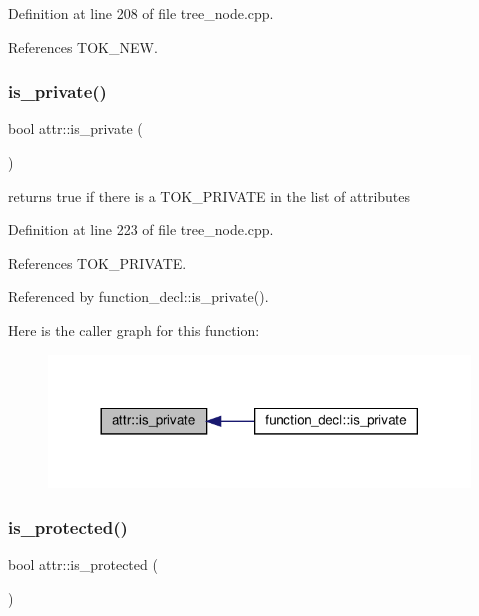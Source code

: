 Definition at line 208 of file tree\+\_\+node.\+cpp.



References T\+O\+K\+\_\+\+N\+EW.

\mbox{\label{structattr_ad63a36123b0f975d24acdab8651c2b70}} 
\subsubsection{\texorpdfstring{is\+\_\+private()}{is\_private()}}
{\footnotesize\ttfamily bool attr\+::is\+\_\+private (\begin{DoxyParamCaption}{ }\end{DoxyParamCaption})}



returns true if there is a T\+O\+K\+\_\+\+P\+R\+I\+V\+A\+TE in the list of attributes 



Definition at line 223 of file tree\+\_\+node.\+cpp.



References T\+O\+K\+\_\+\+P\+R\+I\+V\+A\+TE.



Referenced by function\+\_\+decl\+::is\+\_\+private().

Here is the caller graph for this function\+:
\nopagebreak
\begin{figure}[H]
\begin{center}
\leavevmode
\includegraphics[width=317pt]{dc/de4/structattr_ad63a36123b0f975d24acdab8651c2b70_icgraph}
\end{center}
\end{figure}
\mbox{\label{structattr_a9082e7e1db15a75b382be7a30590dc6a}} 
\subsubsection{\texorpdfstring{is\+\_\+protected()}{is\_protected()}}
{\footnotesize\ttfamily bool attr\+::is\+\_\+protected (\begin{DoxyParamCaption}{ }\end{DoxyParamCaption})}



